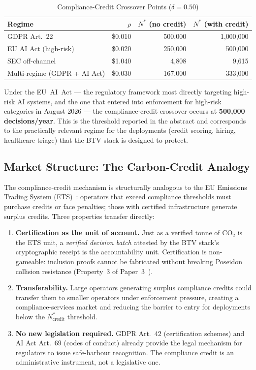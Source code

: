 \begin{table}[h]
\centering
\caption{Compliance-Credit Crossover Points ($\delta = 0.50$)}
\label{tab:credit-crossover}
\begin{tabular}{lrrr}
\toprule
\textbf{Regime} & $\rho$ & $N^*$ (no credit) & $N^*$ (with credit) \\
\midrule
GDPR Art.~22          & \$0.010 & 500{,}000   & 1{,}000{,}000 \\
EU AI Act (high-risk) & \$0.020 & 250{,}000   & 500{,}000     \\
SEC off-channel       & \$1.040 & 4{,}808     & 9{,}615       \\
Multi-regime (GDPR + AI Act) & \$0.030 & 167{,}000 & 333{,}000 \\
\bottomrule
\end{tabular}
\end{table}

Under the EU~AI~Act --- the regulatory framework most directly
targeting high-risk AI systems, and the one that entered into
enforcement for high-risk categories in August 2026 --- the
compliance-credit crossover occurs at \textbf{500,000
decisions/year}. This is the threshold reported in the abstract and
corresponds to the practically relevant regime for the deployments
(credit scoring, hiring, healthcare triage) that the BTV stack is
designed to protect.

\subsection{Market Structure: The Carbon-Credit Analogy}
\label{subsec:carbon-analogy}

The compliance-credit mechanism is structurally analogous to the EU
Emissions Trading System (ETS)~\cite{ellerman2010}: operators that
exceed compliance thresholds must purchase credits or face penalties;
those with certified infrastructure generate surplus credits. Three
properties transfer directly:

\begin{enumerate}
  \item \textbf{Certification as the unit of account.} Just as a
  verified tonne of $\text{CO}_2$ is the ETS unit, a
  \emph{verified decision batch} attested by the BTV stack's
  cryptographic receipt is the accountability unit.
  Certification is non-gameable: inclusion proofs cannot be
  fabricated without breaking Poseidon collision resistance
  (Property~3 of Paper~3~\cite{btv-ar2026}).

  \item \textbf{Transferability.} Large operators generating surplus
  compliance credits could transfer them to smaller operators under
  enforcement pressure, creating a compliance-services market and
  reducing the barrier to entry for deployments below the
  $N^*_{\text{credit}}$ threshold.

  \item \textbf{No new legislation required.} GDPR Art.~42
  (certification schemes) and AI Act Art.~69 (codes of conduct)
  already provide the legal mechanism for regulators to issue
  safe-harbour recognition. The compliance credit is an
  administrative instrument, not a legislative one.
\end{enumerate}
